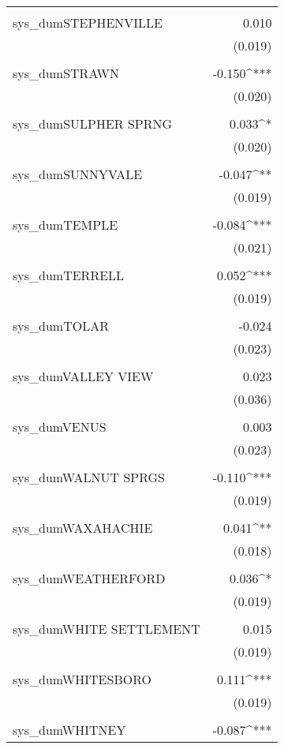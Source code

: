 \begin{table}[!htbp]
\begin{tabular}{@{\extracolsep{5pt}}lD{.}{.}{-3} }
  & \\ 
 sys\_dumSTEPHENVILLE & 0.010 \\ 
  & (0.019) \\ 
  & \\ 
 sys\_dumSTRAWN & -0.150^{***} \\ 
  & (0.020) \\ 
  & \\ 
 sys\_dumSULPHER SPRNG & 0.033^{*} \\ 
  & (0.020) \\ 
  & \\ 
 sys\_dumSUNNYVALE & -0.047^{**} \\ 
  & (0.019) \\ 
  & \\ 
 sys\_dumTEMPLE & -0.084^{***} \\ 
  & (0.021) \\ 
  & \\ 
 sys\_dumTERRELL & 0.052^{***} \\ 
  & (0.019) \\ 
  & \\ 
 sys\_dumTOLAR & -0.024 \\ 
  & (0.023) \\ 
  & \\ 
 sys\_dumVALLEY VIEW & 0.023 \\ 
  & (0.036) \\ 
  & \\ 
 sys\_dumVENUS & 0.003 \\ 
  & (0.023) \\ 
  & \\ 
 sys\_dumWALNUT SPRGS & -0.110^{***} \\ 
  & (0.019) \\ 
  & \\ 
 sys\_dumWAXAHACHIE & 0.041^{**} \\ 
  & (0.018) \\ 
  & \\ 
 sys\_dumWEATHERFORD & 0.036^{*} \\ 
  & (0.019) \\ 
  & \\ 
 sys\_dumWHITE SETTLEMENT & 0.015 \\ 
  & (0.019) \\ 
  & \\ 
 sys\_dumWHITESBORO & 0.111^{***} \\ 
  & (0.019) \\ 
  & \\ 
 sys\_dumWHITNEY & -0.087^{***} \\ 

\end{tabular}
\end{table}
